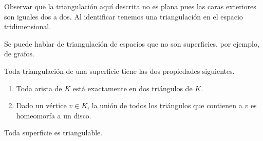\documentclass[GTSResumen.tex]{subfiles}
\begin{document}
\begin{ej}
\begin{enumerate}
\begin{tikzpicture}[line cap=round,line join=round,>=triangle 45,x=1.0cm,y=1.0cm]
\end{tikzpicture}
Observar que la triangulación aquí descrita no es plana pues las caras exteriores son iguales dos a dos. Al identificar tenemos una triangulación en el espacio tridimensional.
\end{enumerate}
\end{ej}

\begin{nota}
Se puede hablar de triangulación de espacios que no son superficies, por ejemplo, de grafos.
\end{nota}

\begin{prop}\label{534}
Toda triangulación de una superficie tiene las dos  propiedades siguientes.
\begin{enumerate}
\item Toda arista de $K$ está exactamente en dos triángulos de $K$.
\item Dado un vértice $v\in K$, la unión de todos los triángulos que contienen a $v$ es homeomorfa a un disco.


\end{enumerate}
\end{prop}

\begin{teorema}
Toda superficie es triangulable.
\end{teorema}
\end{document}
